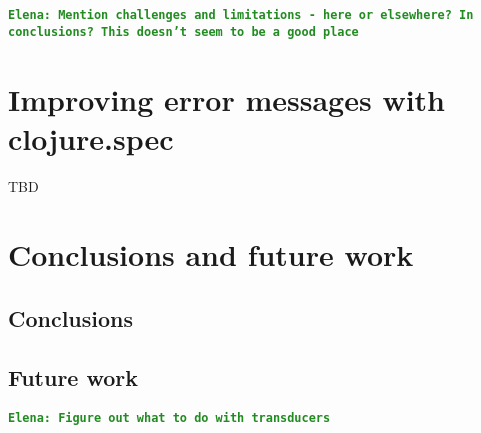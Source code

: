\documentclass[12pt]{article}
\newcommand{\comment}[1]{{\bf \tt  {#1}}}
\newcommand{\emcomment}[1]{\textcolor{ForestGreen}{\comment{Elena: {#1}}}}
\begin{document}
\emcomment{Mention challenges and limitations - here or elsewhere? In conclusions? 
This doesn't seem to be a good place}

\section{Improving error messages with clojure.spec}
TBD

\section{Conclusions and future work}
	\subsection{Conclusions}
	\subsection{Future work}
\emcomment{Figure out what to do with transducers}
	


\end{document}
